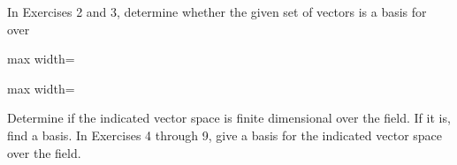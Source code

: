 \documentclass[11pt,oneside]{article}
\begin{document}
\BookNarrativefalse

\begin{BookBody}




\noindent In Exercises 2 and 3, determine whether the given set of vectors is a basis for  over 

\begin{center}\begin{adjustbox}{max width=\linewidth}\end{adjustbox}\end{center}

\begin{center}\begin{adjustbox}{max width=\linewidth}\end{adjustbox}\end{center}

\noindent Determine if the indicated vector space is finite dimensional over the field. If it is, find a basis. In Exercises 4 through 9, give a basis for the indicated vector space over the field.







\end{BookBody}
\end{document}
